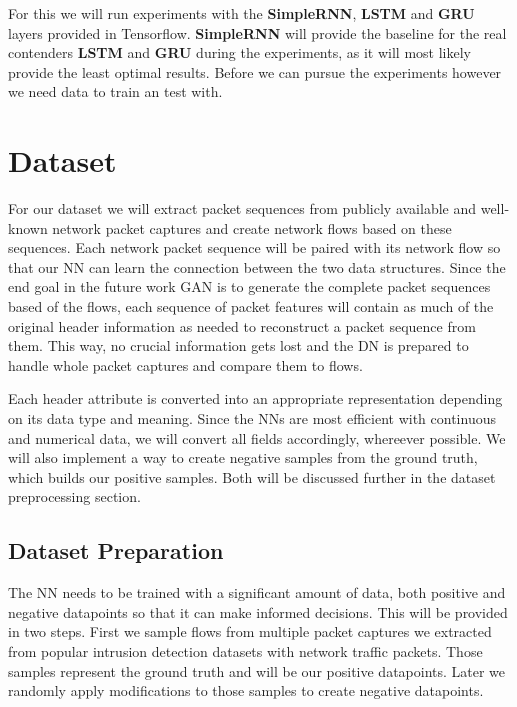 \documentclass[
	ngerman,
	ruledheaders=section,%
	class=report,%
	thesis={type=bachelor},%
	accentcolor=9c,%
	custommargins=true,%
	marginpar=false,%
	parskip=half-,%
	fontsize=11pt,%
]{tudapub}
\begin{document}
For this we will run experiments with the \textbf{SimpleRNN}, \textbf{LSTM} and \textbf{GRU} layers provided in Tensorflow.
\textbf{SimpleRNN} will provide the baseline for the real contenders \textbf{LSTM} and \textbf{GRU} during the experiments, as it will most likely provide the least optimal results.
Before we can pursue the experiments however we need data to train an test with.


\section{Dataset}
\label{sec:dataset}

For our dataset we will extract packet sequences from publicly available and well-known network packet captures and create network flows based on these sequences.
Each network packet sequence will be paired with its network flow so that our NN can learn the connection between the two data structures.
Since the end goal in the future work GAN is to generate the complete packet sequences based of the flows,
each sequence of packet features will contain as much of the original header information as needed to reconstruct a packet sequence from them.
This way, no crucial information gets lost and the DN is prepared to handle whole packet captures and compare them to flows.

Each header attribute is converted into an appropriate representation depending on its data type and meaning.
Since the NNs are most efficient with continuous and numerical data, we will convert all fields accordingly, whereever possible.
We will also implement a way to create negative samples from the ground truth, which builds our positive samples.
Both will be discussed further in the dataset preprocessing section.

\subsection{Dataset Preparation}
\label{sec:datasetPrep}

The NN needs to be trained with a significant amount of data, both positive and negative datapoints so that it can make informed decisions.
This will be provided in two steps.
First we sample flows from multiple packet captures we extracted from popular intrusion detection datasets with network traffic packets.
Those samples represent the ground truth and will be our positive datapoints.
Later we randomly apply modifications to those samples to create negative datapoints.
\end{document}
